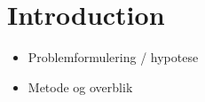 \chapter{Introduction}

\begin{itemize}
\item Problemformulering / hypotese
\item Metode og overblik
\end{itemize}

